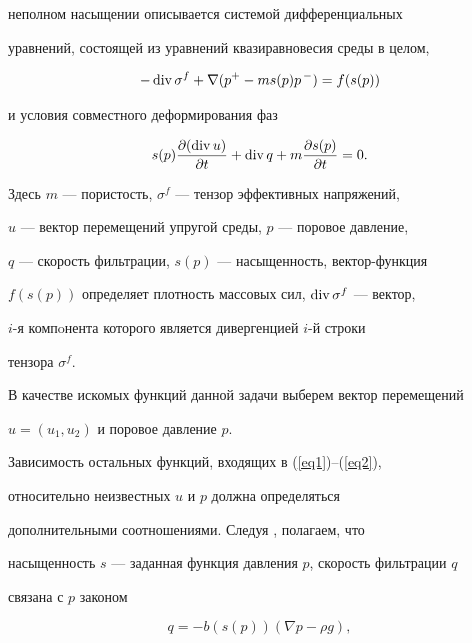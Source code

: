 неполном насыщении описывается системой дифференциальных


уравнений, состоящей из уравнений квазиравновесия среды в целом,


\begin{equation}


-\Div \sigma^{f}+\nabla(p^{+} - m s(p) p^{\,-}) = f(s(p))


\label{eq1}


\end{equation}


и условия совместного деформирования фаз


\begin{equation}


s(p) \frac{\partial(\Div u)}{\partial t} + \Div q + m 


\frac{\partial s(p)}{\partial t} = 0.


\label{eq2}


\end{equation}


Здесь $m$ --- пористость, $\sigma^{f}$ --- тензор эффективных напряжений,


$u$ --- вектор перемещений упругой среды, $p$ --- поровое давление,


$q$ --- скорость фильтрации, $s(p)$ --- насыщенность, вектор-функция


$f(s(p))$ определяет плотность массовых сил, $\operatorname{div}\sigma^{f}$ --- вектор,


$i$-я компoнента которого является дивергенцией $i$-й строки


тензора $\sigma^{f}$.





В качестве искомых функций данной задачи выберем вектор перемещений


$u=(u_{1},u_{2})$ и поровое давление $p$.


Зависимость остальных функций, входящих в (\ref{eq1})--(\ref{eq2}),


относительно неизвестных $u$ и $p$ должна определяться


дополнительными соотношениями. Следуя \cite{1}, полагаем, что


насыщенность $s$ --- заданная функция давления $p$, скорость фильтрации $q$


связана с $p$ законом


\begin{equation}


q = - b(s(p)) (\nabla p - \rho g) ,


\label{eq3}


\end {equation}


